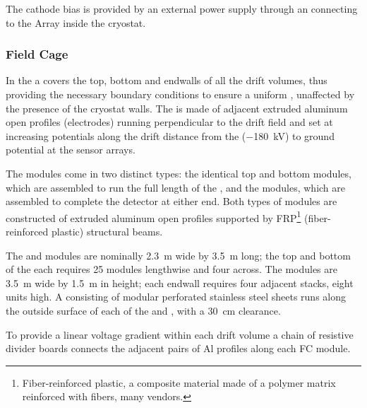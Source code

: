 The cathode bias is provided by an external  power supply through an  \fdth connecting to the  Array %
inside the cryostat. 
 
\subsubsection{Field Cage}
\label{sec:fdsp-hv-des-fc}

In the  a  covers the top, bottom and endwalls of all the drift volumes, thus providing the necessary
boundary conditions to ensure a uniform \efield, unaffected by the presence of the cryostat walls. %
The  is made of adjacent extruded aluminum open profiles (electrodes) running perpendicular to the drift field and set at increasing potentials along the \spmaxdrift drift distance from the   (\SI{-180}{kV}) to ground potential at the  sensor arrays. %

The  modules come in two distinct types: the identical top and bottom modules, which are assembled to run the full length of the , and the  modules, 
which are assembled to complete the detector at either end. Both types of modules are constructed of extruded aluminum open profiles  supported by FRP\footnote{Fiber-reinforced plastic, a composite material made of a polymer matrix reinforced with fibers, many vendors.} (fiber-reinforced plastic) structural beams.  

The  and  modules are nominally  \SI{2.3}{\meter} wide by \SI{3.5}{\meter} long; the top and bottom of the  each requires 25 modules lengthwise and four across.  The  modules are \SI{3.5}{\meter} wide by \SI{1.5}{\meter} in height; each endwall requires four adjacent stacks, eight units high. A  consisting of modular %
perforated stainless steel sheets %
runs along the outside surface of each of the %
 and , with a \SI{30}{\centi\meter} clearance. 

To provide a linear voltage gradient within each drift volume %
a chain of resistive divider boards connects the adjacent pairs of Al profiles along each FC module. 

